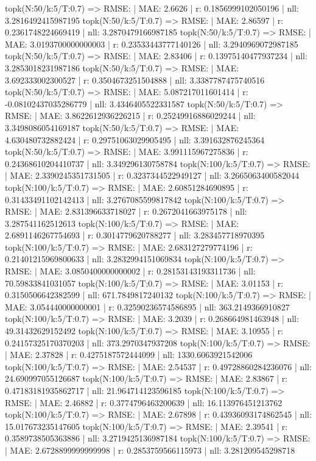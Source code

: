 topk(N:50/k:5/T:0.7) => RMSE: | MAE: 2.6626 | r: 0.1856999102050196 | nll: 3.2816492415987195
topk(N:50/k:5/T:0.7) => RMSE: | MAE: 2.86597 | r: 0.2361748224669419 | nll: 3.2870479166987185
topk(N:50/k:5/T:0.7) => RMSE: | MAE: 3.0193700000000003 | r: 0.23533443777140126 | nll: 3.2940969072987185
topk(N:50/k:5/T:0.7) => RMSE: | MAE: 2.83406 | r: 0.13975140477937234 | nll: 3.2853018231987186
topk(N:50/k:5/T:0.7) => RMSE: | MAE: 3.692333002300527 | r: 0.3504673251504888 | nll: 3.3387787475740516
topk(N:50/k:5/T:0.7) => RMSE: | MAE: 5.087217011601414 | r: -0.08102437035286779 | nll: 3.4346405522331587
topk(N:50/k:5/T:0.7) => RMSE: | MAE: 3.8622612936226215 | r: 0.25249916886029244 | nll: 3.3498086054169187
topk(N:50/k:5/T:0.7) => RMSE: | MAE: 4.630480732882424 | r: 0.29751063029905495 | nll: 3.391632876245364
topk(N:50/k:5/T:0.7) => RMSE: | MAE: 3.991115967275836 | r: 0.24368610204410737 | nll: 3.349296130758784
topk(N:100/k:5/T:0.7) => RMSE: | MAE: 2.3390245351731505 | r: 0.3237344522949127 | nll: 3.2665063400582044
topk(N:100/k:5/T:0.7) => RMSE: | MAE: 2.60851284690895 | r: 0.31433491102142413 | nll: 3.2767085599817842
topk(N:100/k:5/T:0.7) => RMSE: | MAE: 2.831396633718027 | r: 0.2672041663975178 | nll: 3.287541162512613
topk(N:100/k:5/T:0.7) => RMSE: | MAE: 2.6891146267754693 | r: 0.3014779620788277 | nll: 3.283457718970395
topk(N:100/k:5/T:0.7) => RMSE: | MAE: 2.683127279774196 | r: 0.21401215969800633 | nll: 3.2832994151069834
topk(N:100/k:5/T:0.7) => RMSE: | MAE: 3.0850400000000002 | r: 0.28153143193311736 | nll: 70.59833841031057
topk(N:100/k:5/T:0.7) => RMSE: | MAE: 3.01153 | r: 0.3150506642382599 | nll: 671.7849817240132
topk(N:100/k:5/T:0.7) => RMSE: | MAE: 3.054440000000001 | r: 0.32590236574586895 | nll: 363.2149366910827
topk(N:100/k:5/T:0.7) => RMSE: | MAE: 3.2039 | r: 0.268664981463948 | nll: 49.31432629152492
topk(N:100/k:5/T:0.7) => RMSE: | MAE: 3.10955 | r: 0.24157325170370203 | nll: 373.2970347937208
topk(N:100/k:5/T:0.7) => RMSE: | MAE: 2.37828 | r: 0.4275187572444099 | nll: 1330.6063921542006
topk(N:100/k:5/T:0.7) => RMSE: | MAE: 2.54537 | r: 0.49728860284236076 | nll: 24.690997055126687
topk(N:100/k:5/T:0.7) => RMSE: | MAE: 2.83867 | r: 0.47183181935862717 | nll: 21.964714123596185
topk(N:100/k:5/T:0.7) => RMSE: | MAE: 2.46882 | r: 0.3774796463200639 | nll: 16.113976451213762
topk(N:100/k:5/T:0.7) => RMSE: | MAE: 2.67898 | r: 0.43936093174862545 | nll: 15.017673235147605
topk(N:100/k:5/T:0.7) => RMSE: | MAE: 2.39541 | r: 0.3589738505363886 | nll: 3.2719425136987184
topk(N:100/k:5/T:0.7) => RMSE: | MAE: 2.6728899999999998 | r: 0.2853759566115973 | nll: 3.281209545298718
